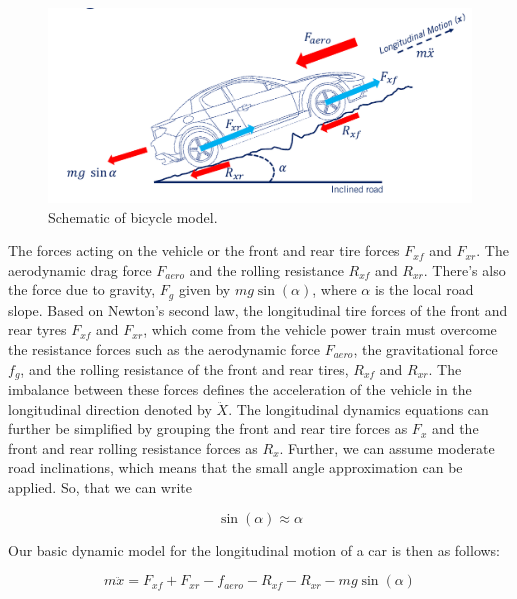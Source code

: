 \begin{figure}[!htb]
\begin{center}
\includegraphics[scale=0.290]{img/longitudinal_model/longitudinal_model_1.jpeg}
\end{center}
\caption{Schematic of bicycle model.}
\label{longitudinal_model_1}
\end{figure}


The forces acting on the vehicle or the front and rear tire forces $F_{xf}$ and $F_{xr}$. The aerodynamic drag force $F_{aero}$ and the rolling resistance $R_{xf}$ and $R_{xr}$. 
There's also the force due to gravity, $F_g$ given by  $mg\sin(\alpha)$, where  $\alpha$ is the local road slope. 
Based on Newton's second law, the longitudinal tire forces of the front and rear tyres $F_{xf}$ and $F_{xr}$, which come from the vehicle power train must overcome the resistance forces such as the aerodynamic force $F_{aero}$, the gravitational force $f_g$, and the rolling resistance of the front and rear tires, $R_{xf}$ and $R_{xr}$. 
The imbalance between these forces defines the acceleration of the vehicle in the longitudinal direction denoted by $\ddot{X}$. 
The longitudinal dynamics equations can further be simplified by grouping the front and rear tire forces as $F_x$ and the front and rear rolling resistance forces as $R_x$. 
Further, we can assume moderate road inclinations, which means that the small angle approximation can be applied. So, that we can write

\begin{equation}
\sin(\alpha) \approx \alpha
\end{equation}

Our basic dynamic model for the longitudinal motion of a car is then as follows:

\begin{equation}
m\ddot{x} = F_{xf} + F_{xr} - f_{aero} - R_{xf} - R_{xr} - mg\sin(\alpha)
\end{equation}

